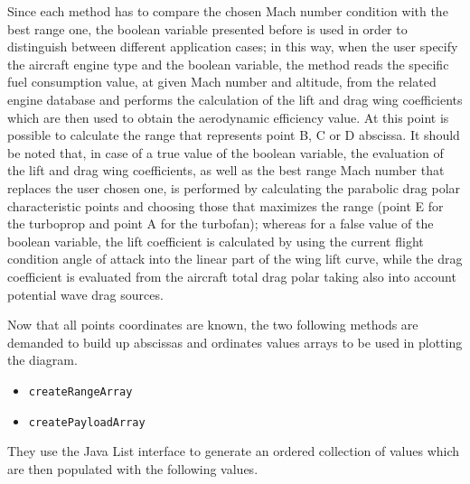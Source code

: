 \bigskip
\noindent
Since each method has to compare the chosen Mach number condition with the best range one, the boolean variable presented before is used in order to distinguish between different application cases; in this way, when the user specify the aircraft engine type and the boolean variable, the method reads the specific fuel consumption value, at given Mach number and altitude, from the related engine database and performs the calculation of the lift and drag wing coefficients which are then used to obtain the aerodynamic efficiency value. At this point is possible to calculate the range that represents point B, C or D abscissa. 
%
It should be noted that, in case of a true value of the boolean variable, the evaluation of the lift and drag wing coefficients, as well as the best range Mach number that replaces the user chosen one, is performed by calculating the parabolic drag polar characteristic points and choosing those that maximizes the range (point E for the turboprop and point A for the turbofan); whereas for a false value of the boolean variable, the lift coefficient is calculated by using the current flight condition angle of attack into the linear part of the wing lift curve, while the drag coefficient is evaluated from the aircraft total drag polar taking also into account potential wave drag sources.   

\bigskip
\noindent
Now that all points coordinates are known, the two following methods are demanded to build up abscissas and ordinates values arrays to be used in plotting the diagram.
%
\begin{itemize}
\item\lstinline[language=Java]!createRangeArray!
\item\lstinline[language=Java]!createPayloadArray!
\end{itemize}
%
\begin{table}[!ht]
\centering
{}
\caption{Payload and range array components}
\label{table:Table3}
\end{table}
%
\noindent
They use the Java \gls{List} interface to generate an ordered collection of values which are then populated with the following values.

